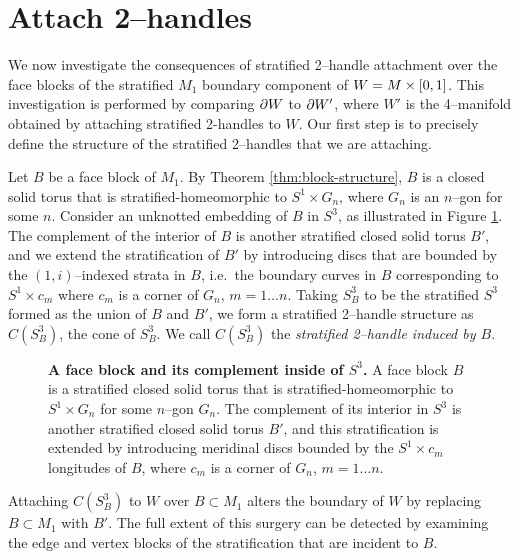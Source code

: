 \section{Attach 2--handles}

We now investigate the consequences of stratified 2--handle attachment over the face blocks of the stratified $M_1$ boundary component of $W=M\times[0,1]$.
This investigation is performed by comparing $\partial W$ to $\partial W'$, where $W'$ is the 4--manifold obtained by attaching stratified 2-handles to $W$.
Our first step is to precisely define the structure of the stratified 2--handles that we are attaching.

Let $B$ be a face block of $M_1$.
By Theorem \ref{thm:block-structure}, $B$ is a closed solid torus that is stratified-homeomorphic to $S^1\times G_n$, where $G_n$ is an $n$--gon for some $n$.
Consider an unknotted embedding of $B$ in $S^3$, as illustrated in Figure \ref{fig:face-block-complement}.
The complement of the interior of $B$ is another stratified closed solid torus $B'$, and we extend the stratification of $B'$ by introducing discs that are bounded by the $(1,i)$--indexed strata in $B$, i.e.\ the boundary curves in $B$ corresponding to $S^1\times c_m$ where $c_m$ is a corner of $G_n$, $m=1\dots n$.
Taking $S_B^3$ to be the stratified $S^3$ formed as the union of $B$ and $B'$, we form a stratified 2--handle structure as $C(S_B^3)$, the cone of $S_B^3$.
We call $C(S_B^3)$ the \emph{stratified 2--handle induced by $B$}.

\begin{figure}[h!]
	\caption{
		\textbf{A face block and its complement inside of $S^3$.}
		A face block $B$ is a stratified closed solid torus that is stratified-homeomorphic to $S^1\times G_n$ for some $n$--gon $G_n$.
		The complement of its interior in $S^3$ is another stratified closed solid torus $B'$, and this stratification is extended by introducing meridinal discs bounded by the $S^1\times c_m$ longitudes of $B$, where $c_m$ is a corner of $G_n$, $m=1\dots n$.
	}
	\label{fig:face-block-complement}
\end{figure}

Attaching $C(S_B^3)$ to $W$ over $B\subset M_1$ alters the boundary of $W$ by replacing $B\subset M_1$ with $B'$.
The full extent of this surgery can be detected by examining the edge and vertex blocks of the stratification that are incident to $B$.

